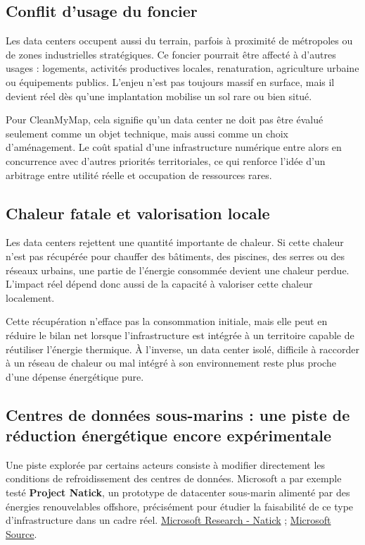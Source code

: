 \documentclass[
  10pt,
  a4paper,
  DIV=11,
  numbers=noendperiod,
  oneside]{scrreprt}
\let\oldtextbf\textbf
\renewcommand{\textbf}[1]{\oldtextbf{\textcolor{cmmnavy}{#1}}}
\begin{document}
\subsection{Conflit d'usage du foncier}\label{conflit-dusage-du-foncier}

Les data centers occupent aussi du terrain, parfois à proximité de
métropoles ou de zones industrielles stratégiques. Ce foncier pourrait
être affecté à d'autres usages : logements, activités productives
locales, renaturation, agriculture urbaine ou équipements publics.
L'enjeu n'est pas toujours massif en surface, mais il devient réel dès
qu'une implantation mobilise un sol rare ou bien situé.

Pour CleanMyMap, cela signifie qu'un data center ne doit pas être évalué
seulement comme un objet technique, mais aussi comme un choix
d'aménagement. Le coût spatial d'une infrastructure numérique entre
alors en concurrence avec d'autres priorités territoriales, ce qui
renforce l'idée d'un arbitrage entre utilité réelle et occupation de
ressources rares.

\subsection{Chaleur fatale et valorisation
locale}\label{chaleur-fatale-et-valorisation-locale}

Les data centers rejettent une quantité importante de chaleur. Si cette
chaleur n'est pas récupérée pour chauffer des bâtiments, des piscines,
des serres ou des réseaux urbains, une partie de l'énergie consommée
devient une chaleur perdue. L'impact réel dépend donc aussi de la
capacité à valoriser cette chaleur localement.

Cette récupération n'efface pas la consommation initiale, mais elle peut
en réduire le bilan net lorsque l'infrastructure est intégrée à un
territoire capable de réutiliser l'énergie thermique. À l'inverse, un
data center isolé, difficile à raccorder à un réseau de chaleur ou mal
intégré à son environnement reste plus proche d'une dépense énergétique
pure.

\subsection{Centres de données sous-marins : une piste de réduction
énergétique encore
expérimentale}\label{centres-de-donnuxe9es-sous-marins-une-piste-de-ruxe9duction-uxe9nerguxe9tique-encore-expuxe9rimentale}

Une piste explorée par certains acteurs consiste à modifier directement
les conditions de refroidissement des centres de données. Microsoft a
par exemple testé \textbf{Project Natick}, un prototype de datacenter
sous-marin alimenté par des énergies renouvelables offshore, précisément
pour étudier la faisabilité de ce type d'infrastructure dans un cadre
réel.
\href{https://www.microsoft.com/en-us/research/project/natick/?lang=fr-ca}{Microsoft
Research - Natick} ;
\href{https://news.microsoft.com/source/features/sustainability/project-natick-underwater-datacenter/}{Microsoft
Source}.
\end{document}
